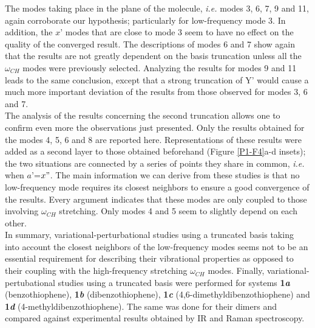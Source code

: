 	The modes taking place in the plane of the molecule, \textit{i.e.} modes 3, 6, 7, 9 and 11, again corroborate our hypothesis; particularly for low-frequency mode 3. In addition, the $x’$ modes that are close to mode 3 seem to have no effect on the quality of the converged result. The descriptions of modes 6 and 7 show again that the results are not greatly dependent on the basis truncation unless all the $\omega_{CH}$ modes were previously selected. Analyzing the results for modes 9 and 11 leads to the same conclusion, except that a strong truncation of Y’ would cause a much more important deviation of the results from those observed for modes 3, 6 and 7.\\
	
	The analysis of the results concerning the second truncation allows one to confirm even more the observations just presented. Only the results obtained for the modes 4, 5, 6 and 8 are reported here. Representations of these results were added as a second layer to those obtained beforehand (Figure \ref{P1-F4}a-d insets); the two situations are connected by a series of points they share in common, \textit{i.e.} when $a’$=$x"$. The main information we can derive from these studies is that no low-frequency mode requires its closest neighbors to ensure a good convergence of the results. Every argument indicates that these modes are only coupled to those involving $\omega_{CH}$ stretching. Only modes 4 and 5 seem to slightly depend on each other.\\
	
		In summary, variational-perturbational studies using a truncated basis taking into account the closest neighbors of the low-frequency modes seems not to be an essential requirement for describing their vibrational properties as opposed to their coupling with the high-frequency stretching $\omega_{CH}$ modes. Finally, variational-pertubational studies using a truncated basis were performed for systems \textbf{1\textit{a}} (benzothiophene), \textbf{1\textit{b}} (dibenzothiophene), \textbf{1\textit{c}} (4,6-dimethyldibenzothiophene) and \textbf{1\textit{d}} (4-methyldibenzothiophene). The same was done for their dimers and compared against experimental results obtained by IR and Raman spectroscopy.\\
	
